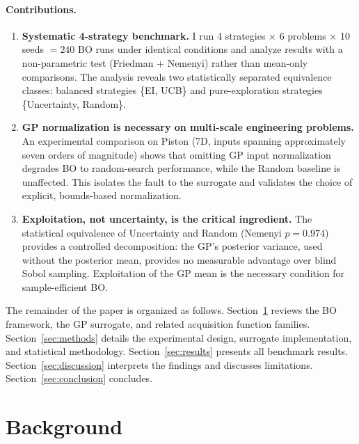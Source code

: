 \paragraph{Contributions.}
\begin{enumerate}[nosep]
  \item \textbf{Systematic 4-strategy benchmark.}
    I run 4 strategies $\times$ 6 problems $\times$ 10 seeds $= 240$
    BO runs under identical conditions and analyze results with a
    non-parametric test (Friedman + Nemenyi) rather than mean-only
    comparisons.
    The analysis reveals two statistically separated equivalence classes:
    balanced strategies \{EI, UCB\} and pure-exploration strategies
    \{Uncertainty, Random\}.

  \item \textbf{GP normalization is necessary on multi-scale engineering
    problems.}
    An experimental comparison on Piston (7D, inputs spanning
    approximately seven orders of magnitude) shows that omitting GP input
    normalization degrades BO to random-search performance, while the
    Random baseline is unaffected.
    This isolates the fault to the surrogate and validates the choice
    of explicit, bounds-based normalization.

  \item \textbf{Exploitation, not uncertainty, is the critical ingredient.}
    The statistical equivalence of Uncertainty and Random (Nemenyi
    $p = 0.974$) provides a controlled decomposition: the GP's
    posterior variance, used without the posterior mean, provides no
    measurable advantage over blind Sobol sampling.
    Exploitation of the GP mean is the necessary condition for
    sample-efficient BO.
\end{enumerate}

The remainder of the paper is organized as follows.
Section~\ref{sec:background} reviews the BO framework, the GP surrogate,
and related acquisition function families.
Section~\ref{sec:methods} details the experimental design, surrogate
implementation, and statistical methodology.
Section~\ref{sec:results} presents all benchmark results.
Section~\ref{sec:discussion} interprets the findings and discusses
limitations.
Section~\ref{sec:conclusion} concludes.

\section{Background}
\label{sec:background}

